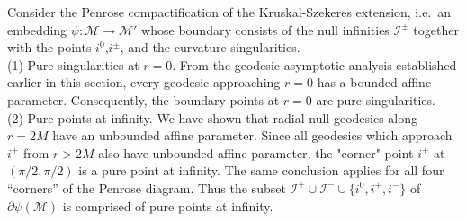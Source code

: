 \documentclass[pdflatex,sn-mathphys-num]{sn-jnl}
\newtheorem{prop}[theorem]{Proposition}
\theoremstyle{definition}
\begin{document}

    Consider the Penrose compactification of the Kruskal-Szekeres extension, i.e.\ an embedding $\psi:\mathcal{M} \rightarrow \mathcal{M}'$ whose boundary consists of the null infinities $\mathscr{I}^{\pm}$ together with the points $i^0$,$i^{\pm}$, and the curvature singularities.\\ 
    
    (1) Pure singularities at $r=0$. From the geodesic asymptotic analysis established earlier in this section, every geodesic approaching $r=0$ has a bounded affine parameter. Consequently, the boundary points at $r = 0$ are pure singularities.\\

    (2) Pure points at infinity. We have shown that radial null geodesics along $r=2M$ have an unbounded affine parameter. Since all geodesics which approach $i^{+}$ from $r > 2M$ also have unbounded affine parameter, the "corner" point $i^{+}$ at $(\pi/2,\pi/2)$ is a pure point at infinity. The same conclusion applies for all four “corners” of the Penrose diagram. Thus the subset $\mathscr{I}^{+} \cup \mathscr{I}^{-} \cup \{i^0,i^{+},i^{-}\}$ of $\partial\psi(\mathcal{M})$ is comprised of pure points at infinity.\\
    
\end{document}
